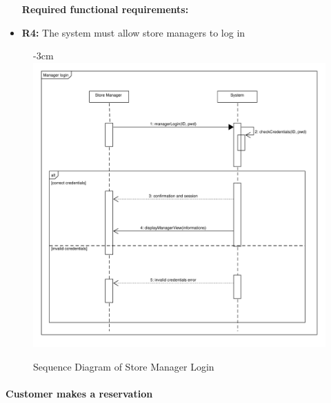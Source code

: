 \documentclass{article}
\begin{document}
\begin{center}
					\begin{itemize}
					\bigskip
					\bigskip
					\bigskip
					 {\bfseries Required functional requirements: }
					\item {\bfseries R4: } The system must allow store managers to log in
					

					\end{itemize}

							\begin{figure}
								\begin{adjustwidth} {-3cm}{}
									\centering
									\includegraphics[scale=0.7]{SD/4_managerLogin.pdf}\\
									\caption{Sequence Diagram of Store Manager Login}
								\end{adjustwidth}
							\end{figure}
					
				\end{center}
				\newpage
			
			\paragraph{Customer makes a reservation}
			
\end{document}
